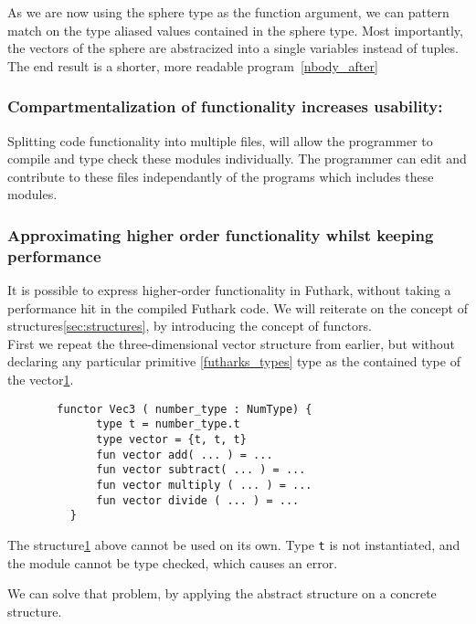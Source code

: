 \noindent As we are now using the sphere type as the function argument, we can pattern
match on the type aliased values contained in the sphere type.
Most importantly, the vectors of the sphere are abstracized into a single variables
instead of tuples.
\\
The end result is a shorter, more readable program~\ref{nbody_after}

\subsubsection{Compartmentalization of functionality increases usability:}
Splitting code functionality into multiple files, will allow the programmer to
compile and type check these modules individually. The programmer can edit and
contribute to these files independantly of the programs which includes these
modules.

\subsubsection{Approximating higher order functionality whilst keeping performance}
\label{subsec:higherorderfunctionality}
It is possible to express higher-order functionality in Futhark, without taking
a performance hit in the compiled Futhark code.
We will reiterate on the concept of structures\ref{sec:structures}, by introducing
the concept of functors.\\
First we repeat the three-dimensional vector structure
from earlier, but without declaring any particular
primitive \ref{futharks_types} type as the contained type of the vector\ref{struct_vec3}.

\begin{figure}\label{struct_vec3}
  \begin{verbatim}
  functor Vec3 ( number_type : NumType) { 
        type t = number_type.t
        type vector = {t, t, t}
        fun vector add( ... ) = ...
        fun vector subtract( ... ) = ...
        fun vector multiply ( ... ) = ...
        fun vector divide ( ... ) = ...
    }
  \end{verbatim}
\end{figure}
\noindent
The structure\ref{struct_vec3} above cannot be used on its own. Type \texttt{t} is not
instantiated, and the module cannot be type checked, which causes an error.

\noindent
We can solve that problem, by applying the abstract structure on a concrete
structure.

